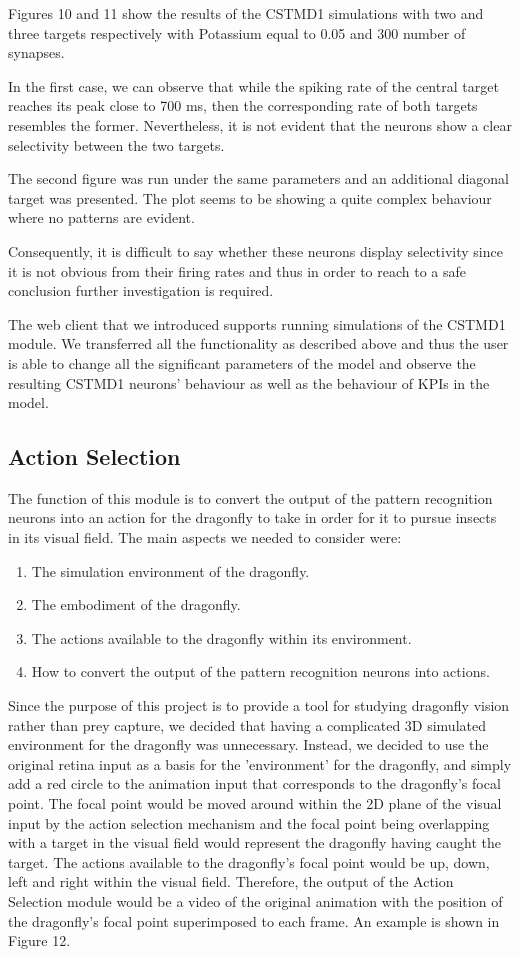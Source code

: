\documentclass[a4paper,11pt]{article}
\begin{document}
Figures 10 and 11 show the results of the CSTMD1 simulations with two and three targets respectively with Potassium equal to 0.05 and 300 number of synapses. 

In the first case, we can observe that while the spiking rate of the central target reaches its peak close to 700 ms, then the corresponding rate of both targets resembles the former. Nevertheless, it is not evident that the neurons show a clear selectivity between the two targets.

The second figure was run under the same parameters and an additional diagonal target was presented. The plot seems to be showing a quite complex behaviour where no patterns are evident.

Consequently, it is difficult to say whether these neurons display selectivity since it is not obvious from their firing rates and thus in order to reach to  a safe conclusion further investigation is required.

The web client that we introduced supports running simulations of the CSTMD1 module. We transferred all the functionality as described above and thus the user is able to change all the significant parameters of the model and observe the resulting CSTMD1 neurons' behaviour as well as the behaviour of KPIs in the model.

\subsection{Action Selection}

The function of this module is to convert the output of the pattern recognition neurons into an action for the dragonfly to take in order for it to pursue insects in its visual field.
The main aspects we needed to consider were:
\begin{enumerate}
	\item The simulation environment of the dragonfly.
	\item The embodiment of the dragonfly.
	\item The actions available to the dragonfly within its environment.
	\item How to convert the output of the pattern recognition neurons into actions.
\end{enumerate}


	Since the purpose of this project is to provide a tool for studying dragonfly vision rather than prey capture, we decided that having a complicated 3D simulated environment for the dragonfly was unnecessary. Instead, we decided to use the original retina input as a basis for the 'environment' for the dragonfly, and simply add a red circle to the animation input that corresponds to the dragonfly's focal point. The focal point would be moved around within the 2D plane of the visual input by the action selection mechanism and the focal point being overlapping with a target in the visual field would represent the dragonfly having caught the target. The actions available to the dragonfly's focal point would be up, down, left and right within the visual field. Therefore, the output of the Action Selection module would be a video of the original animation with the position of the dragonfly's focal point superimposed to each frame. An example is shown in Figure 12.
\end{document}
